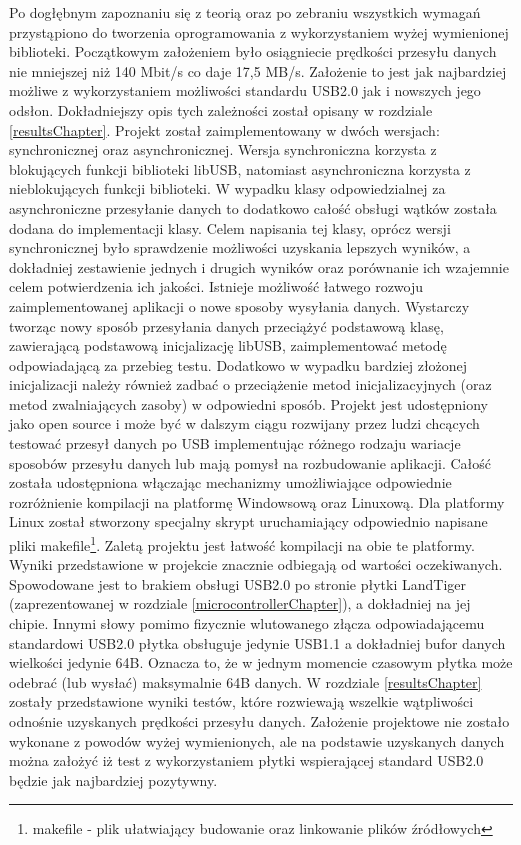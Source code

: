 \documentclass{BscUS}
\begin{document}
\indent Po dogłębnym zapoznaniu się z teorią oraz po zebraniu wszystkich wymagań przystąpiono do tworzenia oprogramowania z wykorzystaniem wyżej wymienionej biblioteki. Początkowym założeniem było osiągniecie prędkości przesyłu danych nie mniejszej niż 140 Mbit/s co daje 17,5 MB/s. Założenie to jest jak najbardziej możliwe z wykorzystaniem możliwości standardu USB2.0 jak i nowszych jego odsłon. Dokładniejszy opis tych zależności został opisany w rozdziale \ref{resultsChapter}. Projekt został zaimplementowany w dwóch wersjach: synchronicznej oraz asynchronicznej. Wersja synchroniczna korzysta z blokujących funkcji biblioteki libUSB, natomiast asynchroniczna korzysta z nieblokujących funkcji biblioteki. W wypadku klasy odpowiedzialnej za asynchroniczne przesyłanie danych to dodatkowo całość obsługi wątków została dodana do implementacji klasy. Celem napisania tej klasy, oprócz wersji synchronicznej było sprawdzenie możliwości uzyskania lepszych wyników, a dokładniej zestawienie jednych i drugich wyników oraz porównanie ich wzajemnie celem potwierdzenia ich jakości. Istnieje możliwość łatwego rozwoju zaimplementowanej aplikacji o nowe sposoby wysyłania danych. Wystarczy tworząc nowy sposób przesyłania danych przeciążyć podstawową klasę, zawierającą podstawową inicjalizację libUSB, zaimplementować metodę odpowiadającą za przebieg testu. Dodatkowo w wypadku bardziej złożonej inicjalizacji należy również zadbać o przeciążenie metod inicjalizacyjnych (oraz metod zwalniających zasoby) w odpowiedni sposób.
\newline
\indent Projekt jest udostępniony jako open source i może być w dalszym ciągu rozwijany przez ludzi chcących testować przesył danych po USB implementując różnego rodzaju wariacje sposobów przesyłu danych lub mają pomysł na rozbudowanie aplikacji. Całość została udostępniona włączając mechanizmy umożliwiające odpowiednie rozróżnienie kompilacji na platformę Windowsową oraz Linuxową. Dla platformy Linux został stworzony specjalny skrypt uruchamiający odpowiednio napisane pliki makefile\footnote{makefile - plik ułatwiający budowanie oraz linkowanie plików źródłowych}. Zaletą projektu jest łatwość kompilacji na obie te platformy.
\newline
\indent Wyniki przedstawione w projekcie znacznie odbiegają od wartości oczekiwanych. Spowodowane jest to brakiem obsługi USB2.0 po stronie płytki LandTiger (zaprezentowanej w rozdziale \ref{microcontrollerChapter}), a dokładniej na jej chipie. Innymi słowy pomimo fizycznie wlutowanego złącza odpowiadającemu standardowi USB2.0 płytka obsługuje jedynie USB1.1 a dokładniej bufor danych wielkości jedynie 64B. Oznacza to, że w jednym momencie czasowym płytka może odebrać (lub wysłać) maksymalnie 64B danych. W rozdziale \ref{resultsChapter} zostały przedstawione wyniki testów, które rozwiewają wszelkie wątpliwości odnośnie uzyskanych prędkości przesyłu danych. Założenie projektowe nie zostało wykonane z powodów wyżej wymienionych, ale na podstawie uzyskanych danych można założyć iż test z wykorzystaniem płytki wspierającej standard USB2.0 będzie jak najbardziej pozytywny.
\end{document}
